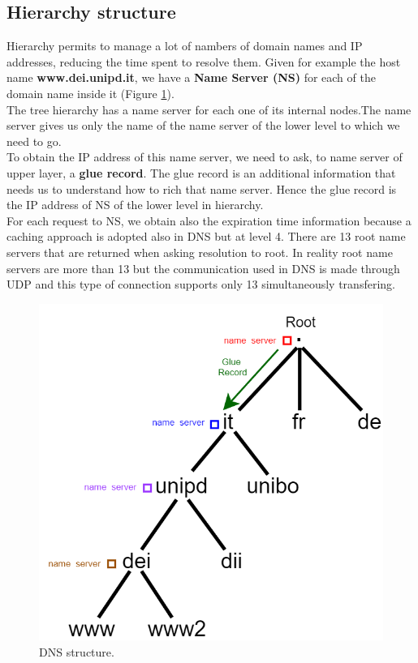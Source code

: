 \subsection{Hierarchy structure}
Hierarchy permits to manage a lot of nambers of domain names and IP addresses, reducing the time spent to resolve them. Given for example the host name \textbf{www.dei.unipd.it}, we have a \textbf{Name Server (NS)} for each of the domain name inside it (Figure \ref{DNS_hierarchy}).\\
The tree hierarchy has a name server for each one of its internal nodes.The name server gives us only the name of the name server of the lower level to which we need to go.\\
To obtain the IP address of this name server, we need to ask, to name server of upper layer, a \textbf{glue record}. The glue record is an additional information that needs us to understand how to rich that name server. Hence the glue record is the IP address of NS of the lower level in hierarchy. \\
For each request to NS, we obtain also the expiration time information because a caching approach is adopted also in DNS but at level 4. There are 13 root name servers that are returned when asking resolution to root. In reality root name servers are more than 13 but the communication used in DNS is made through UDP and this type of connection supports only 13 simultaneously transfering.
\begin{figure}[h]
\centering
\includegraphics[scale=0.55]{Images/Resolution/DNS_hierarchy}
\caption{\footnotesize{DNS structure.}}\label{DNS_hierarchy}
\end{figure}
